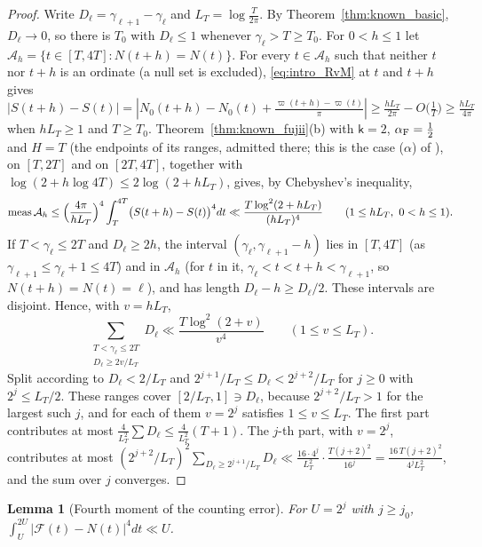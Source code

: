 \documentclass[11pt,a4paper]{article}
\makeatletter
\numberwithin{equation}{section}
\DeclareRobustCommand{\CGref}[1]{\ref{#1}}
\DeclareRobustCommand{\CGeqref}[1]{\eqref{#1}}
\DeclareRobustCommand{\CGcite}[2][]{\if\relax\detokenize{#1}\relax\cite{#2}\else\cite[#1]{#2}\fi}
\let\CG@origref\ref
\let\CG@origeqref\eqref
\newcommand{\CG@gettip}[1]{\@ifundefined{CGTip@#1}{#1}{\csname CGTip@#1\endcsname}}
\newcommand{\CG@getbib}[1]{\@ifundefined{CGBib@#1}{#1}{\csname CGBib@#1\endcsname}}
\DeclareRobustCommand{\CGref}[1]{\pdftooltip{\CG@origref{#1}}{\CG@gettip{#1}}}
\DeclareRobustCommand{\CGeqref}[1]{\pdftooltip{\CG@origeqref{#1}}{\CG@gettip{#1}}}
\DeclareRobustCommand{\CGcite}[2][]{\pdftooltip{\if\relax\detokenize{#1}\relax\cite{#2}\else\cite[#1]{#2}\fi}{\CG@getbib{#2}}}
\newtheorem{lemma}[theorem]{Lemma}
\theoremstyle{definition}
\theoremstyle{remark}
\newcommand{\Nz}{N_0} %
\newcommand{\Fc}{\mathcal F}
\newcommand{\meas}{\operatorname{meas}}
\makeatother
\begin{document}
\begin{proof}
Write $D_\ell=\gamma_{\ell+1}-\gamma_\ell$ and $L_T=\log\frac T{2\pi}$. By Theorem~\CGref{thm:known_basic}, $D_\ell\to0$, so there is $T_0$ with $D_\ell\le1$ whenever $\gamma_\ell>T\ge T_0$. For $0<h\le1$ let $\mathcal A_h=\{t\in[T,4T]:N(t+h)=N(t)\}$. For every $t\in\mathcal A_h$ such that neither $t$ nor $t+h$ is an ordinate (a null set is excluded), \CGeqref{eq:intro_RvM} at $t$ and $t+h$ gives $|S(t+h)-S(t)|=|\Nz(t+h)-\Nz(t)+\frac{\varpi(t+h)-\varpi(t)}\pi|\ge\frac{hL_T}{2\pi}-O\bigl(\frac1T\bigr)\ge\frac{hL_T}{4\pi}$ when $hL_T\ge1$ and $T\ge T_0$. Theorem~\CGref{thm:known_fujii}(b) with $\mathsf k=2$, $\alpha_{\rm F}=\frac12$ and $H=T$ (the endpoints of its ranges, admitted there; this is the case ($\alpha$) of \CGcite{Fujii1981}), on $[T,2T]$ and on $[2T,4T]$, together with $\log(2+h\log4T)\le2\log(2+hL_T)$, gives, by Chebyshev's inequality,
\begin{equation}
\meas\mathcal A_h\le\Bigl(\frac{4\pi}{hL_T}\Bigr)^4\int_T^{4T}\bigl(S(t+h)-S(t)\bigr)^4dt\ll\frac{T\log^2(2+hL_T)}{(hL_T)^4}\qquad(1\le hL_T,\ 0<h\le1).
\label{eq:disp_24}
\end{equation}
If $T<\gamma_\ell\le2T$ and $D_\ell\ge2h$, the interval $(\gamma_\ell,\gamma_{\ell+1}-h)$ lies in $[T,4T]$ (as $\gamma_{\ell+1}\le\gamma_\ell+1\le4T$) and in $\mathcal A_h$ (for $t$ in it, $\gamma_\ell<t<t+h<\gamma_{\ell+1}$, so $N(t+h)=N(t)=\ell$), and has length $D_\ell-h\ge D_\ell/2$. These intervals are disjoint. Hence, with $v=hL_T$,
\begin{equation}
\sum_{\substack{T<\gamma_\ell\le2T\\ D_\ell\ge2v/L_T}}D_\ell\ll\frac{T\log^2(2+v)}{v^4}\qquad(1\le v\le L_T).
\label{eq:disp_25}
\end{equation}
Split according to $D_\ell<2/L_T$ and $2^{j+1}/L_T\le D_\ell<2^{j+2}/L_T$ for $j\ge0$ with $2^j\le L_T/2$. These ranges cover $[2/L_T,1]\ni D_\ell$, because $2^{j+2}/L_T>1$ for the largest such $j$, and for each of them $v=2^j$ satisfies $1\le v\le L_T$. The first part contributes at most $\frac4{L_T^2}\sum D_\ell\le\frac4{L_T^2}(T+1)$. The $j$-th part, with $v=2^j$, contributes at most $(2^{j+2}/L_T)^2\sum_{D_\ell\ge2^{j+1}/L_T}D_\ell\ll\frac{16\cdot4^j}{L_T^2}\cdot\frac{T(j+2)^2}{16^j}=\frac{16\,T(j+2)^2}{4^jL_T^2}$, and the sum over $j$ converges.
\end{proof}

\begin{lemma}[Fourth moment of the counting error]\label{lem:fourth}
For $U=2^j$ with $j\ge j_0$, $\int_U^{2U}|\Fc(t)-N(t)|^4dt\ll U$.
\end{lemma}
\end{document}

